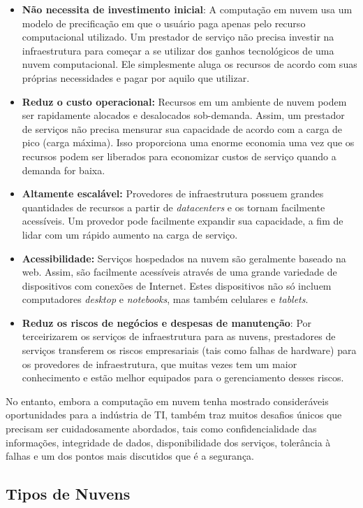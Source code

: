 \begin{itemize}
	\item \textbf{Não necessita de investimento inicial}: A computação em nuvem usa um modelo de precificação em que o usuário paga apenas pelo recurso computacional utilizado. Um prestador de serviço não precisa	investir na infraestrutura para começar a se utilizar dos ganhos tecnológicos de uma nuvem computacional. Ele simplesmente aluga os recursos de acordo com suas próprias necessidades e pagar por aquilo que utilizar.
	\item \textbf{Reduz o custo operacional:} Recursos em um ambiente de nuvem podem ser rapidamente alocados e desalocados sob-demanda. Assim, um prestador de serviços não precisa  mensurar sua capacidade de acordo com a carga de pico (carga máxima). Isso proporciona uma enorme economia uma vez que os recursos podem ser liberados para economizar custos de serviço quando a demanda for baixa.	
	\item \textbf{Altamente escalável:} Provedores de infraestrutura possuem grandes quantidades de recursos a partir de \textit{datacenters} e os tornam facilmente acessíveis. Um provedor pode facilmente expandir sua capacidade, a fim de lidar com um rápido aumento na carga de serviço.	
	\item \textbf{Acessibilidade:} Serviços hospedados na nuvem são geralmente	baseado na web. Assim, são facilmente acessíveis através de uma grande variedade de dispositivos com conexões de Internet. Estes dispositivos não só incluem computadores \textit{desktop} e \textit{notebooks}, mas também celulares e \textit{tablets}.
	\item \textbf{Reduz os riscos de negócios e despesas de manutenção}: Por terceirizarem os serviços de infraestrutura para as nuvens, prestadores de serviços transferem os riscos empresariais (tais como falhas de hardware) para os provedores de infraestrutura, que muitas vezes tem um maior conhecimento e estão melhor equipados para o gerenciamento desses riscos.
\end{itemize}

No entanto, embora a computação em nuvem tenha mostrado consideráveis oportunidades para a indústria de TI, também traz muitos desafios únicos que precisam ser cuidadosamente abordados, tais como confidencialidade das informações, integridade de dados, disponibilidade dos serviços, tolerância à falhas e um dos pontos mais discutidos que é a segurança. 

\subsection{Tipos de Nuvens} \label{cap2sec2subsec2}


